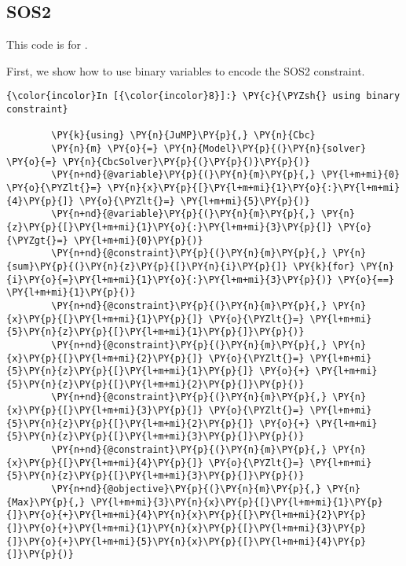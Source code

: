 
\subsection{SOS2}


This code is for .

First, we show how to use binary variables to encode the SOS2 constraint.
\begin{codeCell}
\label{code:SOS2-binary}


    \begin{Verbatim}[commandchars=\\\{\}]
{\color{incolor}In [{\color{incolor}8}]:} \PY{c}{\PYZsh{} using binary constraint}
        
        \PY{k}{using} \PY{n}{JuMP}\PY{p}{,} \PY{n}{Cbc}
        \PY{n}{m} \PY{o}{=} \PY{n}{Model}\PY{p}{(}\PY{n}{solver} \PY{o}{=} \PY{n}{CbcSolver}\PY{p}{(}\PY{p}{)}\PY{p}{)}
        \PY{n+nd}{@variable}\PY{p}{(}\PY{n}{m}\PY{p}{,} \PY{l+m+mi}{0} \PY{o}{\PYZlt{}=} \PY{n}{x}\PY{p}{[}\PY{l+m+mi}{1}\PY{o}{:}\PY{l+m+mi}{4}\PY{p}{]} \PY{o}{\PYZlt{}=} \PY{l+m+mi}{5}\PY{p}{)}
        \PY{n+nd}{@variable}\PY{p}{(}\PY{n}{m}\PY{p}{,} \PY{n}{z}\PY{p}{[}\PY{l+m+mi}{1}\PY{o}{:}\PY{l+m+mi}{3}\PY{p}{]} \PY{o}{\PYZgt{}=} \PY{l+m+mi}{0}\PY{p}{)}
        \PY{n+nd}{@constraint}\PY{p}{(}\PY{n}{m}\PY{p}{,} \PY{n}{sum}\PY{p}{(}\PY{n}{z}\PY{p}{[}\PY{n}{i}\PY{p}{]} \PY{k}{for} \PY{n}{i}\PY{o}{=}\PY{l+m+mi}{1}\PY{o}{:}\PY{l+m+mi}{3}\PY{p}{)} \PY{o}{==} \PY{l+m+mi}{1}\PY{p}{)}
        \PY{n+nd}{@constraint}\PY{p}{(}\PY{n}{m}\PY{p}{,} \PY{n}{x}\PY{p}{[}\PY{l+m+mi}{1}\PY{p}{]} \PY{o}{\PYZlt{}=} \PY{l+m+mi}{5}\PY{n}{z}\PY{p}{[}\PY{l+m+mi}{1}\PY{p}{]}\PY{p}{)}
        \PY{n+nd}{@constraint}\PY{p}{(}\PY{n}{m}\PY{p}{,} \PY{n}{x}\PY{p}{[}\PY{l+m+mi}{2}\PY{p}{]} \PY{o}{\PYZlt{}=} \PY{l+m+mi}{5}\PY{n}{z}\PY{p}{[}\PY{l+m+mi}{1}\PY{p}{]} \PY{o}{+} \PY{l+m+mi}{5}\PY{n}{z}\PY{p}{[}\PY{l+m+mi}{2}\PY{p}{]}\PY{p}{)}
        \PY{n+nd}{@constraint}\PY{p}{(}\PY{n}{m}\PY{p}{,} \PY{n}{x}\PY{p}{[}\PY{l+m+mi}{3}\PY{p}{]} \PY{o}{\PYZlt{}=} \PY{l+m+mi}{5}\PY{n}{z}\PY{p}{[}\PY{l+m+mi}{2}\PY{p}{]} \PY{o}{+} \PY{l+m+mi}{5}\PY{n}{z}\PY{p}{[}\PY{l+m+mi}{3}\PY{p}{]}\PY{p}{)}
        \PY{n+nd}{@constraint}\PY{p}{(}\PY{n}{m}\PY{p}{,} \PY{n}{x}\PY{p}{[}\PY{l+m+mi}{4}\PY{p}{]} \PY{o}{\PYZlt{}=} \PY{l+m+mi}{5}\PY{n}{z}\PY{p}{[}\PY{l+m+mi}{3}\PY{p}{]}\PY{p}{)}
        \PY{n+nd}{@objective}\PY{p}{(}\PY{n}{m}\PY{p}{,} \PY{n}{Max}\PY{p}{,} \PY{l+m+mi}{3}\PY{n}{x}\PY{p}{[}\PY{l+m+mi}{1}\PY{p}{]}\PY{o}{+}\PY{l+m+mi}{4}\PY{n}{x}\PY{p}{[}\PY{l+m+mi}{2}\PY{p}{]}\PY{o}{+}\PY{l+m+mi}{1}\PY{n}{x}\PY{p}{[}\PY{l+m+mi}{3}\PY{p}{]}\PY{o}{+}\PY{l+m+mi}{5}\PY{n}{x}\PY{p}{[}\PY{l+m+mi}{4}\PY{p}{]}\PY{p}{)}
        

\end{Verbatim}
\end{codeCell}
